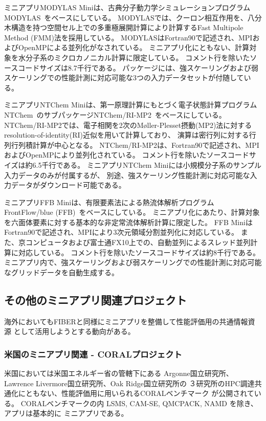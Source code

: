 ミニアプリMODYLAS Miniは、古典分子動力学シミュレーションプログラムMODYLAS~\cite{Modylas_url,Modylas_andoh2013}をベースにしている。
MODYLASでは、クーロン相互作用を、八分木構造を持つ空間セル上での多重極展開計算により計算するFast Multipole Method (FMM)法を採用している。
MODYLASはFortran90で記述され、MPIおよびOpenMPによる並列化がなされている。
ミニアプリ化にともない、計算対象を水分子系のミクロカノニカル計算に限定している。
コメント行を除いたソースコードサイズは8.7千行である。
パッケージには、強スケーリングおよび弱スケーリングでの性能計測に対応可能な3つの入力データセットが付随している。

ミニアプリNTChem Miniは、第一原理計算にもとづく電子状態計算プログラムNTChem~\cite{NTChem_url}のサブパッケージNTChem/RI-MP2~\cite{NTChem_katouda2013}をベースにしている。
NTChem/RI-MP2では、電子相関を2次のM{\o}ller-Plesset摂動(MP2)法に対するresolution-of-identity(RI)近似を用いて計算しており、
演算は密行列に対する行列行列積計算が中心となる。
NTChem/RI-MP2は、Fortran90で記述され、MPIおよびOpenMPにより並列化されている。
コメント行を除いたソースコードサイズは約6.5千行である。
ミニアプリNTChem Miniには小規模分子系のサンプル入力データのみが付属するが、
別途、強スケーリング性能計測に対応可能な入力データがダウンロード可能である。

ミニアプリFFB Miniは、有限要素法による熱流体解析プログラムFrontFlow/blue (FFB)~\cite{FFB_minami2012,FFB_kumahata2013}をベースにしている。
ミニアプリ化にあたり、計算対象を六面体要素に対する基本的な非定常流体解析計算に限定した。
FFB MiniはFortran90で記述され、MPIにより3次元領域分割並列化に対応している。
また、京コンピュータおよび富士通FX10上での、自動並列によるスレッド並列計算に対応している。
コメント行を除いたソースコードサイズは約8千行である。
ミニアプリ内で、強スケーリングおよび弱スケーリングでの性能計測に対応可能なグリッドデータを自動生成する。

\subsection{その他のミニアプリ関連プロジェクト}
\label{sec:その他のミニアプリ}

海外においてもFIBERと同様にミニアプリを整備して性能評価用の共通情報資源
として活用しようとする動向がある。

\subsubsection{米国のミニアプリ関連 - CORALプロジェクト}
米国においては米国エネルギー省の管轄下にある
Argonne国立研究所、Lawrence Livermore国立研究所、Oak Ridge国立研究所の
３研究所のHPC調達共通化にともない、性能評価用に用いられるCORALベンチマーク
が公開されている\cite{CORAL-benchmarks,CORAL-slides}。
CORALベンチマークの内 LSMS, CAM-SE, QMCPACK, NAMD を除き、アプリは基本的に
ミニアプリである。

